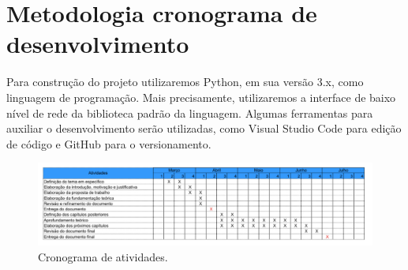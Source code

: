 \chapter{\label{chap:chap4} Metodologia cronograma de desenvolvimento}

Para construção do projeto utilizaremos Python, em sua versão 3.x, como linguagem de programação.
Mais precisamente, utilizaremos a interface de baixo nível de rede da biblioteca padrão da linguagem\cite{socketPython}.
Algumas ferramentas para auxiliar o desenvolvimento serão utilizadas, como Visual Studio Code para edição de código e GitHub para o versionamento.

\begin{figure}[htb!]
    \centering\includegraphics[width=1\textwidth]{fig3.pdf}
    \caption%
    {\label{fig:fig3} Cronograma de atividades.}
\end{figure}



